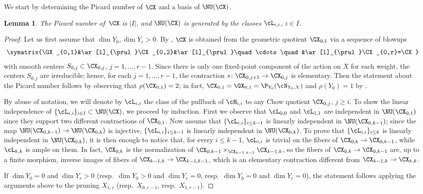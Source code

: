 \documentclass[11pt]{amsart}
\numberwithin{equation}{section}
\newtheorem{lemma}[theorem]{Lemma}
\theoremstyle{definition}
\theoremstyle{remark}
\begin{document}
We start by determining the Picard number of $\CX$ and a basis of $\NU(\CX)$. 

\begin{lemma}\label{lem:pic} 
The Picard number of\, $\CX$ is $|I|$, and $\NU(\CX)$
 is generated by the classes  $\cL_{i,i}$, $i \in I$. 
 \end{lemma}

\begin{proof}
Let us first assume that $\dim Y_0, \dim Y_r >0$.  By \cite[Theorem~1.2 and Remark 5.10]{WORS6}, $\CX$ is obtained from the geometric quotient $\GX_{0,1}$ via a sequence of blowups
\[
\xymatrix{\GX_{0,1}&\ar[l]_{\prul}\CX_{0,2}&\ar[l]_{\prul}\quad\cdots\quad&\ar[l]_{\prul}\CX_{0,r}=\CX}
\]
 with smooth centers $S_{0,j}\subset \CX_{0,j}$, $j=1,\dots,r-1$. Since there is only one fixed-point component of the action on $X$ for each weight, the centers $S_{0,j}$ are irreducible; hence, for each $j=1, \dots,r-1$, the contraction $s\colon \CX_{0,j+1} \to \CX_{0,j}$ is elementary. Then the statement about the Picard number follows by observing that $\rho(\CX_{0,1})=2$; in fact, $\CX_{0,1}=\GX_{0,1}=\P_{Y_0}(\cN_{Y_0,X})$ and $\rho(Y_0)=1$ by \cite[Lemma 2.8]{WORS1}.

By abuse of notation, we will denote by $\cL_{i,i}$ the class of the pullback of $\cH_{i,i}$ to any Chow quotient $\CX_{0,j}$, $j\geq i$. To show the linear independence of $\{\cL_{i,i}\}_{i \in I}\subset\NU(\CX)$, we proceed by induction. First we observe that $\cL_{0,0}$ and $\cL_{1,1}$ are independent in $\NU(\CX_{0,1})$ since they support two different contractions of $\CX_{0,1}$.
Now assume  that $\{\cL_{i,i}\}_{i \le k-1}$ is linearly independent in $\NU(\CX_{0,k-1})$;  since the map $\NU(\CX_{0,k-1}) \to \NU(\CX_{0,k})$ is injective, $\{\cL_{i,i}\}_{i \le k-1}$ is linearly independent in $\NU(\CX_{0,k})$. To prove that $\{\cL_{i,i}\}_{i \le k}$ is linearly independent in $\NU(\CX_{0,k})$, it is then enough to notice that, for every $i \le k-1$, $\cL_{i,i}$ is trivial on the fibers of $\CX_{0,k} \to \CX_{0,k-1}$, while $\cL_{k,k}$ is ample on them. In fact, $\CX_{0,k}$ is the normalization of $\CX_{0,k-1}\times_{\CX_{k-1,k-1}}\CX_{k-1,k}$, so the fibers of $\CX_{0,k} \to \CX_{0,k-1}$ are, up to a finite morphism, inverse images of fibers of $\CX_{k-1,k}\to\CX_{k-1,k-1}$, which is an elementary contraction different from $\CX_{k-1,k}\to\CX_{k,k}$.

If $\dim Y_0 = 0$ and $\dim Y_r >0$ (resp.\ $\dim Y_0 > 0$ and $\dim Y_r =0$, resp.\ $\dim Y_0 = 0$ and $\dim Y_r =0$), the statement follows applying the arguments above to the pruning $X_{1,r}$ (resp.\ $X_{0,r-1}$, resp.\ $X_{1,r-1}$).
\end{proof}
\end{document}

